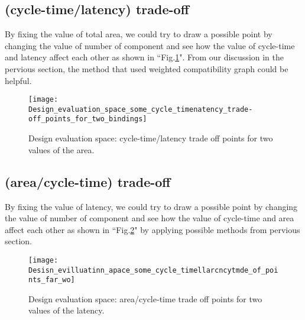 \subsection{(cycle-time/latency) trade-off}

By fixing the value of total area, we could try to draw a possible point by changing the value of number of component and see how the value of cycle-time and latency affect each other as shown in ``Fig.\ref{Design_evaluation_space_some_cycle_timenatency_trade-off_points_for_two_bindings}". From our discussion in the pervious section, the method that used weighted compatibility graph could be helpful.  

\begin{figure}[ht]
    \centering
    \texttt{[image: Design\_evaluation\_space\_some\_cycle\_timenatency\_trade-off\_points\_for\_two\_bindings]}
    \caption{Design evaluation space: cycle-time/latency trade off points for two values of the area. \cite{main}}
    \label{Design_evaluation_space_some_cycle_timenatency_trade-off_points_for_two_bindings}
\end{figure}


\subsection{(area/cycle-time) trade-off}

By fixing the value of latency, we could try to draw a possible point by changing the value of number of component and see how the value of cycle-time and area affect each other as shown in ``Fig.\ref{Desisn_evilluatinn_apace_some_cycle_timellarcncytmde_of_points_far_wo}" by applying possible methods from pervious section.

\begin{figure}[ht]
    \centering
    \texttt{[image: Desisn\_evilluatinn\_apace\_some\_cycle\_timellarcncytmde\_of\_points\_far\_wo]}
    \caption{Design evaluation space: area/cycle-time trade off points for two values of the latency. \cite{main}}
    \label{Desisn_evilluatinn_apace_some_cycle_timellarcncytmde_of_points_far_wo}
\end{figure}


